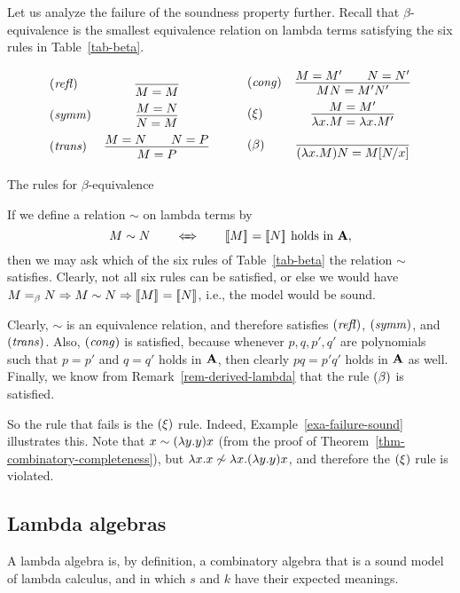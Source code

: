 \documentclass{article}
\begin{document}
Let us analyze the failure of the soundness property further. Recall
that $\beta$-equi\-va\-lence is the smallest equivalence relation on
lambda terms satisfying the six rules in Table~\ref{tab-beta}. 
\begin{table*}[tbp]
  \[ \begin{array}{lc}
    \trule{refl} &
    \deriv{}{M=M} \nl
    \trule{symm} &
    \deriv{M=N}{N=M} \nl
    \trule{trans} &
    \deriv{M=N\sep N=P}{M=P}
  \end{array} \sep
  \begin{array}{lc}
    \trule{cong} &
    \deriv{M=M'\sep N=N'}{MN=M'N'} \nl
    \nrule{\xi} &
    \deriv{M=M'}{\lam x.M=\lam x.M'} \nl
    \nrule{\beta} &
    \deriv{}{(\lam x.M)N= \subst{M}{N}{x}} \nl
  \end{array}
  \]
\caption{The rules for $\beta$-equivalence}
\label{tab-beta}
\end{table*}

If we define a relation $\sim$ on lambda terms by
\[   M\sim N\hspace{2em}\Leftarrow\!\!\!\Rightarrow\hspace{2em} [\![M]\!]_{}=[\![N]\!]_{}\mbox{ holds in ${\bf A}$},
\]
then we may ask which of the six rules of Table~\ref{tab-beta} the
relation $\sim$ satisfies. Clearly, not all six rules can be
satisfied, or else we would have $M=_{\beta} N\Rightarrow M\sim N\Rightarrow
[\![M]\!]_{}=[\![N]\!]_{}$, i.e., the model would be sound.

Clearly, $\sim$ is an equivalence relation, and therefore satisfies
$\textrm{(\textit{refl\/})}$, $\textrm{(\textit{symm\/})}$, and $\textrm{(\textit{trans\/})}$. Also,
$\textrm{(\textit{cong\/})}$ is satisfied, because whenever $p,q,p',q'$ are
polynomials such that $p=p'$ and $q=q'$ holds in ${\bf A}$, then clearly
$pq=p'q'$ holds in ${\bf A}$ as well. Finally, we know from
Remark~\ref{rem-derived-lambda} that the rule $\textrm{(\textit{$\beta$\/})}$ is
satisfied.

So the rule that fails is the $\textrm{(\textit{$\xi$\/})}$ rule. Indeed,
Example~\ref{exa-failure-sound} illustrates this. Note that $x\sim
(\lambda y.y)x$ (from the proof of
Theorem~\ref{thm-combinatory-completeness}), but $\lambda x.x \not\sim
\lambda x.(\lambda y.y)x$, and therefore the $\textrm{(\textit{$\xi$\/})}$ rule is
violated.

\subsection{Lambda algebras}

A lambda algebra is, by definition, a combinatory algebra that is a
sound model of lambda calculus, and in which $s$ and $k$ have their
expected meanings.
\end{document}
